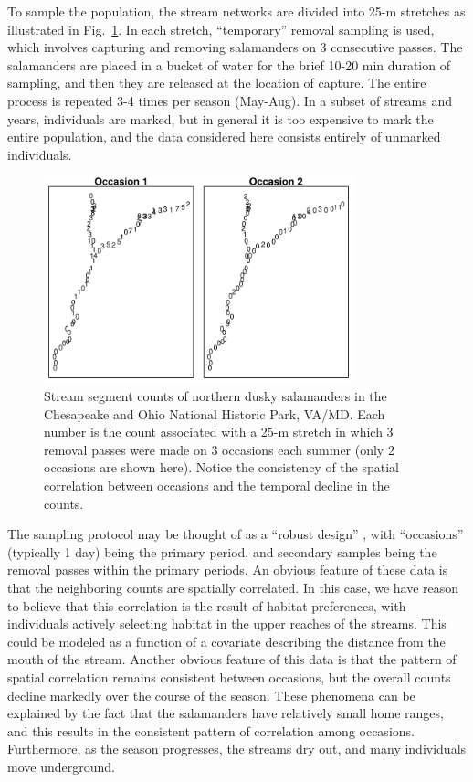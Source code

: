 To sample the population, the stream networks are divided into 25-m
stretches %
as illustrated in Fig.~\ref{unmarked.fig.salct}. In each
stretch, ``temporary'' removal sampling is used, which involves
capturing and removing salamanders on 3 consecutive passes. The
salamanders are placed in a bucket of water for the brief 10-20 min
duration of sampling, and then they are released at the location of
capture. The entire process is repeated 3-4 times per season (May-Aug).
In a subset of streams and years, individuals
are marked, but in general it is too expensive to mark the entire
population, and the data considered here consists entirely of unmarked individuals.

\begin{figure}
  \centering
  \includegraphics[width=0.8\textwidth]{Ch18-Unmarked/figs/saln27}
  \caption{Stream segment counts of northern dusky salamanders
    in the Chesapeake and Ohio National Historic Park,
    VA/MD. Each number is the count associated with a 25-m stretch in which 3 removal passes
    were made on 3 occasions each summer (only 2 occasions are shown
    here). Notice the consistency of the spatial correlation between
    occasions and the temporal decline in the counts.}
  \label{unmarked.fig.salct}
\end{figure}


The sampling protocol may be
thought of as a ``robust design'' \citep{pollock:1982}, with
``occasions'' (typically 1 day) being the primary period, and
secondary samples being the removal passes within the primary
periods. An obvious feature of these data is that the neighboring
counts are spatially correlated. In this case, we have reason to
believe that this correlation is the result of habitat preferences,
with individuals actively selecting habitat in the upper reaches of
the streams. This could be modeled as a function of a covariate
describing the distance from the mouth of the stream. Another obvious
feature of this data is that the pattern of spatial correlation
remains consistent between occasions, but the overall counts decline
markedly over the course of the season.
These phenomena can be explained by the fact that the salamanders have
relatively small home ranges, and this results in the consistent pattern of
correlation  among occasions. Furthermore, as the season progresses, the
streams dry out, and many individuals move underground.

